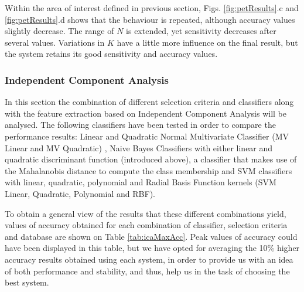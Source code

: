 	Within the area of interest defined in previous section, Figs. \ref{fig:petResults}.c and \ref{fig:petResults}.d shows that the behaviour is repeated, although accuracy values slightly decrease. The range of $N$ is extended, yet sensitivity decreases after several values. Variations in $K$ have a little more influence on the final result, but the system retains its good sensitivity and accuracy values.
	
	\subsubsection{Independent Component Analysis}
	In this section the combination of different selection criteria and classifiers along with the feature extraction based on Independent Component Analysis will be analysed. The following classifiers have been tested in order to compare the performance results: Linear and Quadratic Normal Multivariate Classifier (MV Linear and MV Quadratic) \cite{Krzanowski88}, Naive Bayes Classifiers with either linear and quadratic discriminant function (introduced above), a classifier that makes use of the Mahalanobis distance to compute the class membership \cite{McLachlan1992} and SVM classifiers\cite{Vapnik1998} with linear, quadratic, polynomial and Radial Basis Function kernels (SVM Linear, Quadratic, Polynomial and RBF). 
	
	To obtain a general view of the results that these different combinations yield, values of accuracy obtained for each combination of classifier, selection criteria and database are shown on Table \ref{tab:icaMaxAcc}. Peak values of accuracy could have been displayed in this table, but we have opted for averaging the 10\% higher accuracy results obtained using each system, in order to provide us with an idea of both performance and stability, and thus, help us in the task of choosing the best system. 
	
